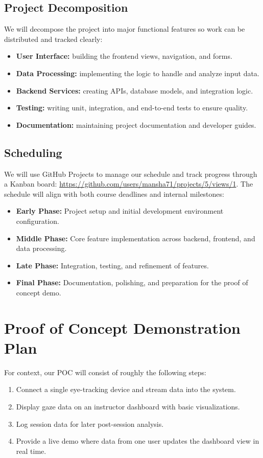 \documentclass{article}
\begin{document}
\subsection*{Project Decomposition}
We will decompose the project into major functional features so work can be
distributed and tracked clearly:
\begin{itemize}
  \item \textbf{User Interface:} building the frontend views, navigation, and forms.
  \item \textbf{Data Processing:} implementing the logic to handle and analyze input data.
  \item \textbf{Backend Services:} creating APIs, database models, and integration logic.
  \item \textbf{Testing:} writing unit, integration, and end-to-end tests to ensure quality.
  \item \textbf{Documentation:} maintaining project documentation and developer guides.
\end{itemize}

\subsection*{Scheduling}
We will use GitHub Projects to manage our schedule and track progress through a
Kanban board: \url{https://github.com/users/mansha71/projects/5/views/1}.  
The schedule will align with both course deadlines and internal milestones:
\begin{itemize}
  \item \textbf{Early Phase:} Project setup and initial development environment configuration.
  \item \textbf{Middle Phase:} Core feature implementation across backend, frontend, and data processing.
  \item \textbf{Late Phase:} Integration, testing, and refinement of features.
  \item \textbf{Final Phase:} Documentation, polishing, and preparation for the proof of concept demo.
\end{itemize}

\section{Proof of Concept Demonstration Plan}

For context, our POC will consist of roughly the following steps:
\begin{enumerate}
  \item Connect a single eye-tracking device and stream data into the system.
  \item Display gaze data on an instructor dashboard with basic visualizations.
  \item Log session data for later post-session analysis.
  \item Provide a live demo where data from one user updates the dashboard view in real time.
\end{enumerate}
\end{document}
